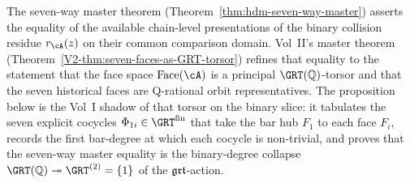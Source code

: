 The seven-way master theorem
(Theorem~\ref{thm:hdm-seven-way-master}) asserts the equality of the
available chain-level presentations of the binary collision residue
$r_\cA(z)$ on their common comparison domain.
Vol~II's master theorem
(Theorem~\ref{V2-thm:seven-faces-as-GRT-torsor}) refines that equality to
the statement that the face space $\Face(\cA)$ is a principal
$\GRT(\mathbb{Q})$-torsor and that the seven historical faces are
Q-rational orbit representatives. The proposition below is the Vol~I
shadow of that torsor on the binary slice: it tabulates the seven
explicit cocycles $\Phi_{1i}\in\GRT^{\mathrm{fin}}$ that take the bar
hub $F_1$ to each face $F_i$, records the first bar-degree at which
each cocycle is non-trivial, and proves that the seven-way master
equality is the binary-degree collapse
$\GRT(\mathbb{Q})\twoheadrightarrow\GRT^{(2)}=\{1\}$ of the
$\mathfrak{grt}$-action.

